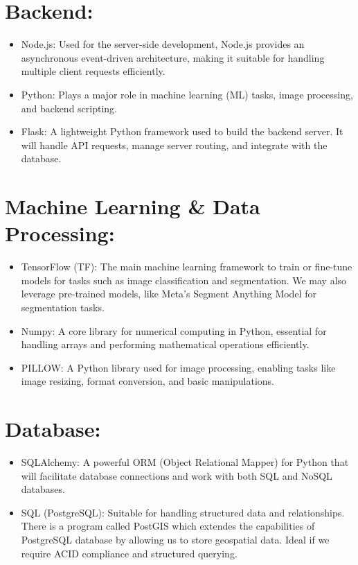 \documentclass{article}
\begin{document}
  \section{Backend:}
  \begin{itemize}
      \item Node.js: Used for the server-side development, Node.js provides an asynchronous event-driven architecture, making it suitable for handling multiple client requests efficiently.
      \item Python: Plays a major role in machine learning (ML) tasks, image processing, and backend scripting.
      \item Flask: A lightweight Python framework used to build the backend server. It will handle API requests, manage server routing, and integrate with the database.
  \end{itemize}
  
  \section{Machine Learning \& Data Processing:}
  \begin{itemize}
      \item TensorFlow (TF): The main machine learning framework to train or fine-tune models for tasks such as image classification and segmentation. We may also leverage pre-trained models, like Meta’s Segment Anything Model for segmentation tasks.
      \item Numpy: A core library for numerical computing in Python, essential for handling arrays and performing mathematical operations efficiently.
      \item PILLOW: A Python library used for image processing, enabling tasks like image resizing, format conversion, and basic manipulations.
  \end{itemize}
  
  \section{Database:}
  \begin{itemize}
      \item SQLAlchemy: A powerful ORM (Object Relational Mapper) for Python that will facilitate database connections and work with both SQL and NoSQL databases.
      \item SQL (PostgreSQL): Suitable for handling structured data and relationships. There is a program called PostGIS which extendes the capabilities of PostgreSQL database by allowing us to store geospatial data. Ideal if we require ACID compliance and structured querying.
  \end{itemize}
  
\end{document}
